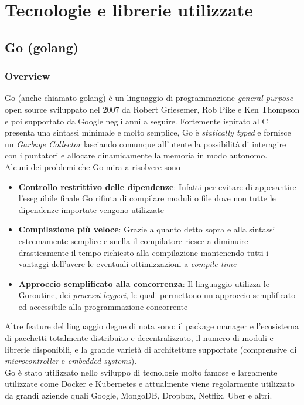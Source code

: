 \chapter{Tecnologie e librerie utilizzate}
\section{Go (golang)}
\subsection{Overview}
Go\cite{Golang} (anche chiamato {golang}) è un linguaggio di programmazione \emph{general purpose} open source sviluppato nel 2007 da Robert Griesemer, Rob Pike e Ken Thompson e poi supportato da Google negli anni a seguire. Fortemente ispirato al C presenta una sintassi minimale e molto semplice, Go è \emph{statically typed} e fornisce un \emph{Garbage Collector} lasciando comunque all'utente la possibilità di interagire con i puntatori e allocare dinamicamente la memoria in modo autonomo.\\
Alcuni dei problemi che Go mira a risolvere sono
\begin{itemize}
    \item \textbf{Controllo restrittivo delle dipendenze}: Infatti per evitare di appesantire l'eseguibile finale Go rifiuta di compilare moduli o file dove non tutte le dipendenze importate vengono utilizzate
    \item \textbf{Compilazione più veloce}: Grazie a quanto detto sopra e alla sintassi estremamente semplice e snella il compilatore riesce a diminuire drasticamente il tempo richiesto alla compilazione mantenendo tutti i vantaggi dell'avere le eventuali ottimizzazioni a \emph{compile time}
    \item \textbf{Approccio semplificato alla concorrenza}: Il linguaggio utilizza le Goroutine, dei \emph{processi leggeri}, le quali permettono un approccio semplificato ed accessibile alla programmazione concorrente
\end{itemize}
Altre feature del linguaggio degne di nota sono: il package manager e l'ecosistema di pacchetti totalmente distribuito  e decentralizzato, il numero di moduli e librerie disponibili, e la grande varietà di architetture supportate (comprensive di \emph{microcontroller} e \emph{embedded systems}).\\
Go è stato utilizzato nello sviluppo di tecnologie molto famose e largamente utilizzate come Docker\cite{Docker} e Kubernetes\cite{Kubernetes} e attualmente viene regolarmente utilizzato da grandi aziende quali Google, MongoDB, Dropbox, Netflix, Uber e altri.

